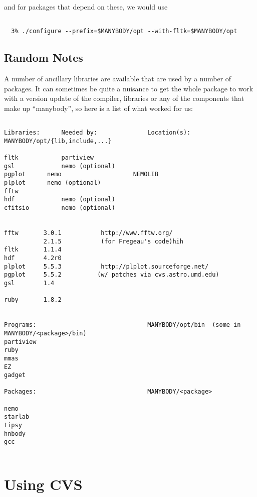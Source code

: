 and for packages that depend on these, we would use

\footnotesize\begin{verbatim}

  3% ./configure --prefix=$MANYBODY/opt --with-fltk=$MANYBODY/opt

\end{verbatim}\normalsize


\section{Random Notes}

A number of ancillary libraries are available that are used by a number
of packages. It can sometimes be quite a nuisance to get the whole package
to work with a version update of the compiler, libraries or any of the
components that make up ``manybody'', so here is a list of what worked
for us:

\footnotesize\begin{verbatim}

Libraries:      Needed by:              Location(s): MANYBODY/opt/{lib,include,...}

fltk            partiview
gsl             nemo (optional)
pgplot		nemo                    NEMOLIB
plplot		nemo (optional)
fftw            
hdf             nemo (optional)
cfitsio         nemo (optional)


fftw       3.0.1           http://www.fftw.org/ 
           2.1.5           (for Fregeau's code)hih
fltk	   1.1.4
hdf        4.2r0
plplot     5.5.3           http://plplot.sourceforge.net/   
pgplot     5.5.2          (w/ patches via cvs.astro.umd.edu)
gsl        1.4

ruby	   1.8.2


Programs:                               MANYBODY/opt/bin  (some in MANYBODY/<package>/bin)
partiview
ruby
mmas
EZ
gadget

Packages:                               MANYBODY/<package>

nemo
starlab
tipsy
hnbody
gcc


\end{verbatim}\normalsize



\chapter                {Using CVS}

